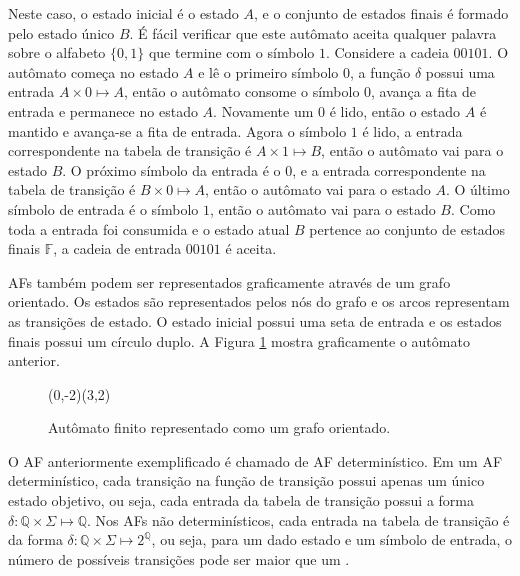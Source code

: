\documentclass[12pt,a4paper]{article}
\let\vState=\origState
\begin{document}
Neste caso, o estado inicial é o estado $A$, e o conjunto de estados finais
é formado pelo estado único $B$. É fácil verificar que este autômato aceita
qualquer palavra sobre o alfabeto $\{0,1\}$ que termine com o símbolo $1$.
Considere a cadeia $00101$. O autômato começa no estado $A$ e lê o primeiro
símbolo $0$, a função $\delta$ possui uma entrada $A \times 0 \mapsto A$,
então o autômato consome o símbolo $0$, avança a fita de entrada e permanece
no estado $A$. Novamente um $0$ é lido, então o estado $A$ é mantido e
avança-se a fita de entrada. Agora o símbolo $1$ é lido, a entrada correspondente
na tabela de transição é $A \times 1 \mapsto B$, então o autômato vai para
o estado $B$. O próximo símbolo da entrada é o $0$, e a entrada correspondente
na tabela de transição é $B \times 0 \mapsto A$, então o autômato vai para o
estado $A$. O último símbolo de entrada é o símbolo $1$, então o autômato vai
para o estado $B$. Como toda a entrada foi consumida e o estado atual $B$
pertence ao conjunto de estados finais $\mathbb{F}$, a cadeia de entrada $00101$ é
aceita.

AFs também podem ser representados graficamente através de
um grafo orientado. Os estados são representados pelos nós do grafo
e os arcos representam as transições de estado. O estado inicial possui
uma seta de entrada e os estados finais possui um círculo duplo. A
Figura \ref{fig:automata} mostra graficamente o autômato anterior.

\begin{figure}[htp]
\begin{center}
\begin{VCPicture}{(0,-2)(3,2)}
\vState[A]{(0,0)}{A} 
 
 
\end{VCPicture}
\caption{Autômato finito representado como um grafo orientado.}
\label{fig:automata}
\end{center}
\end{figure}

O AF anteriormente exemplificado é chamado de AF determinístico.
Em um AF determinístico, cada transição na função de transição possui apenas
um único estado objetivo, ou seja, cada entrada da tabela de transição possui a forma
$\delta: \mathbb{Q} \times \Sigma \mapsto \mathbb{Q}$. Nos AFs não
determinísticos, cada entrada na tabela de transição é da forma
$\delta: \mathbb{Q} \times \Sigma \mapsto 2^{\mathbb{Q}}$,
ou seja, para um dado estado e um símbolo de entrada, o número de possíveis
transições pode ser maior que um .
\end{document}
